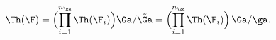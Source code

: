 \begin{equation}
\Th(\F) =  \Bigl(\prod_{i=1}^{n_\ga} \Th(\F_i) \Bigr) \Ga/\tilde\Ga
= \Bigl(\prod_{i=1}^{n_\ga} \Th(\F_i) \Bigr) \, \Ga/\ga.
\label{eq:big-theta}%
\end{equation}

